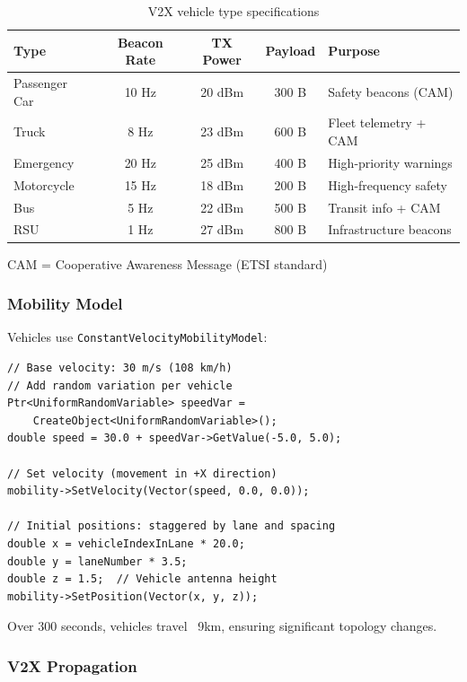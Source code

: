 \begin{table}[htbp]
\centering
\caption{V2X vehicle type specifications}
\label{tab:v2x-vehicles}
\small
\begin{tabular}{@{}lcccp{4cm}@{}}
\toprule
\textbf{Type} & \textbf{Beacon Rate} & \textbf{TX Power} & \textbf{Payload} & \textbf{Purpose} \\
\midrule
Passenger Car & 10 Hz & 20 dBm & 300 B & Safety beacons (CAM) \\
Truck & 8 Hz & 23 dBm & 600 B & Fleet telemetry + CAM \\
Emergency & 20 Hz & 25 dBm & 400 B & High-priority warnings \\
Motorcycle & 15 Hz & 18 dBm & 200 B & High-frequency safety \\
Bus & 5 Hz & 22 dBm & 500 B & Transit info + CAM \\
RSU & 1 Hz & 27 dBm & 800 B & Infrastructure beacons \\
\bottomrule
\end{tabular}
\end{table}

CAM = Cooperative Awareness Message (ETSI standard)

\subsubsection{Mobility Model}

Vehicles use \texttt{ConstantVelocityMobilityModel}:

\begin{lstlisting}[style=cpp, caption={V2X mobility configuration}]
// Base velocity: 30 m/s (108 km/h)
// Add random variation per vehicle
Ptr<UniformRandomVariable> speedVar = 
    CreateObject<UniformRandomVariable>();
double speed = 30.0 + speedVar->GetValue(-5.0, 5.0);

// Set velocity (movement in +X direction)
mobility->SetVelocity(Vector(speed, 0.0, 0.0));

// Initial positions: staggered by lane and spacing
double x = vehicleIndexInLane * 20.0;
double y = laneNumber * 3.5;
double z = 1.5;  // Vehicle antenna height
mobility->SetPosition(Vector(x, y, z));
\end{lstlisting}

Over 300 seconds, vehicles travel ~9km, ensuring significant topology changes.

\subsubsection{V2X Propagation}

